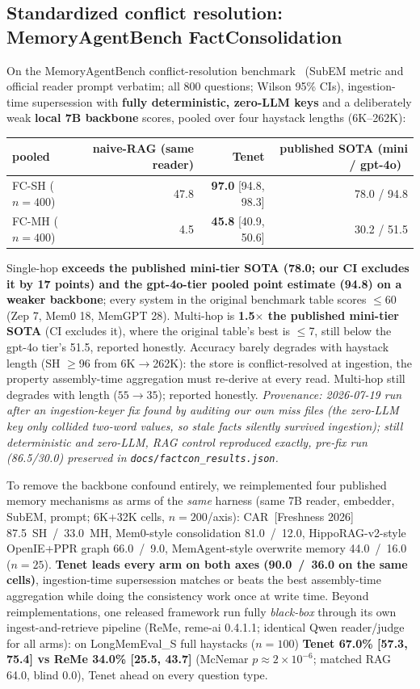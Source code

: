 \documentclass[11pt]{article}
\begin{document}
\subsection{Standardized conflict resolution: MemoryAgentBench FactConsolidation}
On the MemoryAgentBench conflict-resolution benchmark~\cite{mab} (SubEM metric and official reader
prompt verbatim; all 800 questions; Wilson 95\% CIs), ingestion-time supersession with
\textbf{fully deterministic, zero-LLM keys} and a deliberately weak \textbf{local 7B
backbone} scores, pooled over four haystack lengths (6K--262K):
\begin{center}\small
\begin{tabular}{lrrr}
\toprule
pooled & naive-RAG (same reader) & \textbf{Tenet} & published SOTA (mini / gpt-4o)~\cite{freshness} \\
\midrule
FC-SH ($n{=}400$) & 47.8 & \textbf{97.0} [94.8, 98.3] & 78.0 / 94.8 \\
FC-MH ($n{=}400$) & 4.5 & \textbf{45.8} [40.9, 50.6] & 30.2 / 51.5 \\
\bottomrule
\end{tabular}
\end{center}
Single-hop \textbf{exceeds the published mini-tier SOTA (78.0; our CI excludes it by 17
points) and the gpt-4o-tier pooled point estimate (94.8) on a weaker backbone}; every
system in the original benchmark table scores $\le$60 (Zep 7, Mem0 18, MemGPT 28).
Multi-hop is \textbf{1.5$\times$ the published mini-tier SOTA} (CI excludes it), where the
original table's best is $\le$7, still below the gpt-4o tier's 51.5, reported honestly.
Accuracy barely degrades with haystack length (SH $\ge$96 from 6K$\to$262K): the store is
conflict-resolved at ingestion, the property assembly-time aggregation must re-derive at
every read. Multi-hop still degrades with length ($55\!\to\!35$); reported honestly.
\emph{Provenance: 2026-07-19 run after an ingestion-keyer fix found by auditing our own
miss files (the zero-LLM key only collided two-word values, so stale facts silently
survived ingestion); still deterministic and zero-LLM, RAG control reproduced exactly,
pre-fix run (86.5/30.0) preserved in \texttt{docs/factcon\_results.json}.}

To remove the backbone confound entirely, we reimplemented four published memory
mechanisms as arms of the \emph{same} harness (same 7B reader, embedder, SubEM, prompt;
6K+32K cells, $n{=}200$/axis): CAR~[Freshness 2026] 87.5~SH~/~33.0~MH, Mem0-style
consolidation 81.0~/~12.0, HippoRAG-v2-style OpenIE+PPR graph 66.0~/~9.0, MemAgent-style
overwrite memory 44.0~/~16.0 ($n{=}25$). \textbf{Tenet leads every arm on both axes
(90.0~/~36.0 on the same cells)}, ingestion-time supersession matches or beats the best
assembly-time aggregation while doing the consistency work once at write time.
Beyond reimplementations, one released framework run fully \emph{black-box} through its
own ingest-and-retrieve pipeline (ReMe, reme-ai 0.4.1.1; identical Qwen reader/judge for
all arms): on LongMemEval\_S full haystacks ($n{=}100$) \textbf{Tenet 67.0\%
[57.3, 75.4] vs ReMe 34.0\% [25.5, 43.7]} (McNemar $p\approx2\times10^{-6}$; matched
RAG 64.0, blind 0.0), Tenet ahead on every question type.
\end{document}
